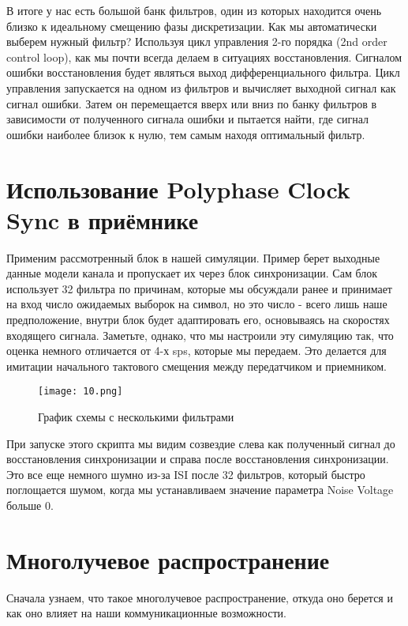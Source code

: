\documentclass[a4paper,12pt]{report}
\begin{document}
В итоге у нас есть большой банк фильтров, один из которых находится очень близко к идеальному смещению фазы дискретизации. Как мы автоматически выберем нужный фильтр? Используя цикл управления 2-го порядка (2nd order control loop), как мы почти всегда делаем в ситуациях восстановления. Сигналом ошибки восстановления будет являться выход дифференциального фильтра. Цикл управления запускается на одном из фильтров и вычисляет выходной сигнал как сигнал ошибки. Затем он перемещается вверх или вниз по банку фильтров в зависимости от полученного сигнала ошибки и пытается найти, где сигнал ошибки наиболее близок к нулю, тем самым находя оптимальный фильтр. 

\section{Использование Polyphase Clock Sync в приёмнике}

Применим рассмотренный блок в нашей симуляции. Пример берет выходные данные модели канала и пропускает их через блок синхронизации. Сам блок использует 32 фильтра по причинам, которые мы обсуждали ранее и принимает на вход число ожидаемых выборок на символ, но это число - всего лишь наше предположение, внутри блок будет адаптировать его, основываясь на скоростях входящего сигнала. Заметьте, однако, что мы настроили эту симуляцию так, что оценка немного отличается от 4-х sps, которые мы передаем. Это делается для имитации начального тактового смещения между передатчиком и приемником. 

\begin{figure}[H]
        \centering
        \texttt{[image: 10.png]}
        \caption{График схемы с несколькими фильтрами}
        \label{fig:ig4_1}
\end{figure}

При запуске этого скрипта мы видим созвездие слева как полученный сигнал
до восстановления синхронизации и справа после восстановления синхронизации. Это все еще немного шумно из-за ISI после 32 фильтров, который быстро поглощается шумом, когда мы устанавливаем значение параметра Noise Voltage больше 0.

\section{Многолучевое распространение}

Сначала узнаем, что такое многолучевое распространение, откуда оно берется и как оно влияет на наши коммуникационные возможности. 
\end{document}
